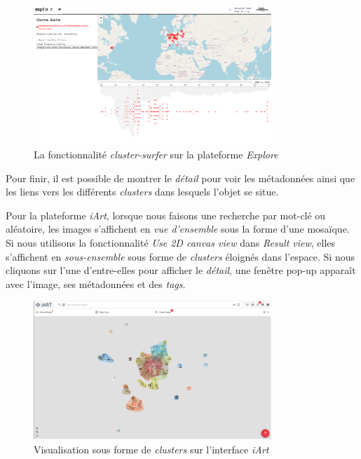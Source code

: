 \begin{figure}[H]
	\centering
	\includegraphics[width=0.8\textwidth]{images/visual_contagion_2.png}
	\caption{La fonctionnalité \textit{cluster-surfer} sur la plateforme \textit{Explore}}
	\label{fig:explore_2}
\end{figure}

Pour finir, il est possible de montrer le \textit{détail} pour voir les métadonnées ainsi que les liens vers les différents \textit{clusters} dans lesquels l'objet se situe. 

Pour la plateforme \textit{iArt}, lorsque nous faisons une recherche par mot-clé ou aléatoire, les images s'affichent en \textit{vue d'ensemble} sous la forme d'une mosaïque. Si nous utilisons la fonctionnalité \textit{Use 2D canvas view} dans \textit{Result view}, elles s'affichent en \textit{sous-ensemble} sous forme de \textit{clusters} éloignés dans l'espace. Si nous cliquons sur l'une d'entre-elles pour afficher le \textit{détail}, une fenêtre pop-up apparaît avec l'image, ses métadonnées et des \textit{tags}.

\begin{figure}[H]
	\centering
	\includegraphics[width=0.8\textwidth]{images/iart_1.png}
	\caption{Visualisation sous forme de \textit{clusters} sur l'interface \textit{iArt}}
	\label{fig:iart_clusters}
\end{figure}

